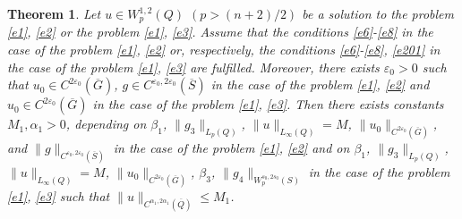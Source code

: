 \documentclass{article}
\theoremstyle{plain}
\newtheorem{theorem}{Theorem}
\begin{document}
\begin{theorem} \label{thr4}
Let  $u\in W_p^{1,2}(Q)$ $(p>(n+2)/2)$ be a solution to the problem  {\rm \eqref{e1}, \eqref{e2}} or the problem {\rm \eqref{e1}, \eqref{e3}}. Assume that the conditions {\rm \eqref{e6}-\eqref{e8}}  in the case of the problem   {\rm \eqref{e1}, \eqref{e2}} or, respectively, the  conditions  
 {\rm \eqref{e6}-\eqref{e8}},  {\rm \eqref{e201}}  in the case of the problem   {\rm \eqref{e1}, \eqref{e3}} are fulfilled. Moreover, there exists 
 $\varepsilon_0>0$ such that $u_0\in C^{2\varepsilon_0}(\overline{G})$, $g\in C^{\varepsilon_0,2\varepsilon_0}(\overline{S})$ in the case of the problem   {\rm \eqref{e1}, \eqref{e2}} and $u_0\in C^{2\varepsilon_0}(\overline{G})$ in the case of the problem   {\rm \eqref{e1}, \eqref{e3}}.
    Then there exists constants  $M_1,\alpha_1>0$, depending on   $\beta_1$, 
$\|g_3\|_{L_{p}(Q)}$, $\|u\|_{L_\infty(Q)}= M$, $\|u_0\|_{C^{2\varepsilon_0}(\overline{G})}$,  and  $\|g\|_{C^{\varepsilon_0,2\varepsilon_0}(\overline{S})}$ in the case of the problem 
  {\rm \eqref{e1}, \eqref{e2}} and  on   $\beta_1$, 
$\|g_3\|_{L_{p}(Q)}$, $\|u\|_{L_\infty(Q)}= M$, $\|u_0\|_{C^{2\varepsilon_0}(\overline{G})}$,   $\beta_3$,  $\|g_4\|_{W_p^{s_0,2s_0}(S)}$ in the case of the problem  {\rm \eqref{e1}, \eqref{e3}}
such that  $\|u\|_{C^{\alpha_1,2\alpha_1}(\overline{Q})}\leq M_1$. 
    \end{theorem}
\end{document}
